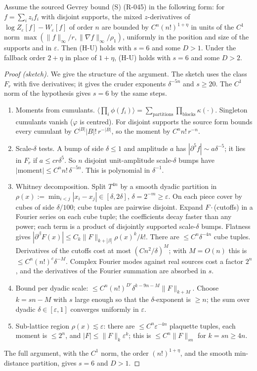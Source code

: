 \begin{proposition}[bridge (B-N1)]\label{prop:BN1}
Assume the sourced Gevrey bound (S) (R-045) in the following form: for $f=\sum_iz_if_i$ with disjoint supports, the mixed $z$-derivatives of $\log Z_\varepsilon[f]-W_\varepsilon[f]$ of order $n$ are bounded by $C^n(n!)^{1+\eta}$ in units of the $C^1$ norm $\max(\|f\|_\infty/r,\|\nabla f\|_\infty/\rho_1)$, uniformly in the position and size of the supports and in $\varepsilon$. Then (H-U) holds with $s=6$ and some $D>1$. Under the fallback order $2+\eta$ in place of $1+\eta$, (H-U) holds with $s=6$ and some $D>2$.
\end{proposition}
\begin{proof}[Proof (sketch)]
We give the structure of the argument. The sketch uses the class $F_r$ with five derivatives; it gives the cruder exponents $\delta^{-5n}$ and $s\ge20$. The $C^1$ norm of the hypothesis gives $s=6$ by the same steps.
\begin{enumerate}
\item Moments from cumulants. $\langle\prod_i\phi(f_i)\rangle=\sum_{\text{partitions}}\prod_{\text{blocks}}\kappa(\cdot)$. Singleton cumulants vanish ($\varphi$ is centred). For disjoint supports the source form bounds every cumulant by $C^{|B|}|B|!\,r^{-|B|}$, so the moment by $C^nn!\,r^{-n}$.
\item Scale-$\delta$ tests. A bump of side $\delta\le1$ and amplitude $a$ has $|\partial^5f|\sim a\delta^{-5}$; it lies in $F_r$ if $a\le cr\delta^5$. So $n$ disjoint unit-amplitude scale-$\delta$ bumps have $|\text{moment}|\le C^nn!\,\delta^{-5n}$. This is polynomial in $\delta^{-1}$.
\item Whitney decomposition. Split $T^{4n}$ by a smooth dyadic partition in $\rho(x):=\min_{i<j}|x_i-x_j|\in[\delta,2\delta]$, $\delta=2^{-m}\ge\varepsilon$. On each piece cover by cubes of side $\delta/100$; cube tuples are pairwise disjoint. Expand $F\cdot$(cutoffs) in a Fourier series on each cube tuple; the coefficients decay faster than any power; each term is a product of disjointly supported scale-$\delta$ bumps. Flatness gives $|\partial^\beta F(x)|\le C_k\|F\|_{k+|\beta|}\rho(x)^k/k!$. There are $\le C^n\delta^{-4n}$ cube tuples. Derivatives of the cutoffs cost at most $(Cn^2/\delta)^M$; with $M=O(n)$ this is $\le C^n(n!)^c\delta^{-M}$. Complex Fourier modes against real sources cost a factor $2^n$, and the derivatives of the Fourier summation are absorbed in $s$.
\item Bound per dyadic scale: $\le C^n(n!)^{D'}\delta^{k-9n-M}\|F\|_{k+M}$. Choose $k=sn-M$ with $s$ large enough so that the $\delta$-exponent is $\ge n$; the sum over dyadic $\delta\in[\varepsilon,1]$ converges uniformly in $\varepsilon$.
\item Sub-lattice region $\rho(x)\lesssim\varepsilon$: there are $\le C^n\varepsilon^{-4n}$ plaquette tuples, each moment is $\le2^n$, and $|F|\le\|F\|_k\varepsilon^k$; this is $\le C^n\|F\|_{sn}$ for $k=sn\ge4n$.
\end{enumerate}
The full argument, with the $C^1$ norm, the order $(n!)^{1+\eta}$, and the smooth min-distance partition, gives $s=6$ and $D>1$.
\end{proof}
